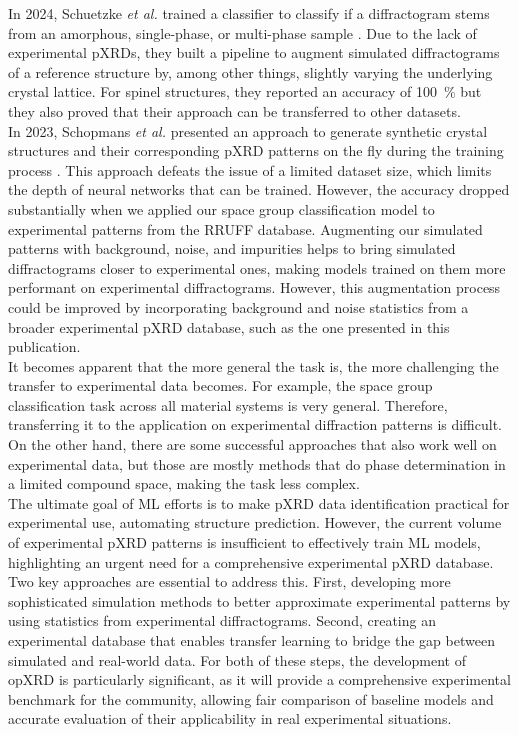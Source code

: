 In 2024, Schuetzke {\it et al.} trained a classifier to classify if a diffractogram stems from an amorphous, single-phase, or multi-phase sample \cite{Schuetzke2024}. Due to the lack of experimental pXRDs, they built a pipeline to augment simulated diffractograms of a reference structure by, among other things, slightly varying the underlying crystal lattice. For spinel structures, they reported an accuracy of \SI{100}{\percent} but they also proved that their approach can be transferred to other datasets.\\

In 2023, Schopmans {\it et al.} presented an approach to generate synthetic crystal structures and their corresponding pXRD patterns on the fly during the training process \cite{Schopmans2023}. This approach defeats the issue of a limited dataset size, which limits the depth of neural networks that can be trained. However, the accuracy dropped substantially when we applied our space group classification model to experimental patterns from the RRUFF database. Augmenting our simulated patterns with background, noise, and impurities helps to bring simulated diffractograms closer to experimental ones, making models trained on them more performant on experimental diffractograms. However, this augmentation process could be improved by incorporating background and noise statistics from a broader experimental pXRD database, such as the one presented in this publication.\\

It becomes apparent that the more general the task is, the more challenging the transfer to experimental data becomes. For example, the space group classification task across all material systems is very general. Therefore, transferring it to the application on experimental diffraction patterns is difficult. \cite{Schopmans2023, Lee2022, Vecsei2018} On the other hand, there are some successful approaches that also work well on experimental data, but those are mostly methods that do phase determination in a limited compound space, making the task less complex. \cite{Schuetzke2024, Lee2020}\\

The ultimate goal of ML efforts is to make pXRD data identification practical for experimental use, automating structure prediction. However, the current volume of experimental pXRD patterns is insufficient to effectively train ML models, highlighting an urgent need for a comprehensive experimental pXRD database. Two key approaches are essential to address this. First, developing more sophisticated simulation methods to better approximate experimental patterns\cite{cao2024simxrd} by using statistics from experimental diffractograms. Second, creating an experimental database that enables transfer learning to bridge the gap between simulated and real-world data. For both of these steps, the development of opXRD is particularly significant, as it will provide a comprehensive experimental benchmark for the community, allowing fair comparison of baseline models and accurate evaluation of their applicability in real experimental situations.